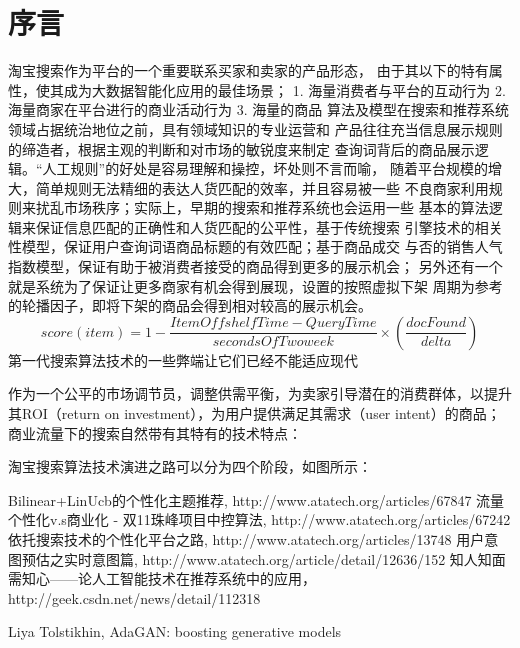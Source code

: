 
\chapter{序言}
\thispagestyle{empty}

\setlength{\fboxrule}{0pt}\setlength{\fboxsep}{0cm}
\noindent\shadowbox{
\begin{tcolorbox}[arc=0mm,colback=lightblue,colframe=darkblue,title=学习目标与要求]

\end{tcolorbox}}
\setlength{\fboxrule}{1pt}\setlength{\fboxsep}{4pt}

淘宝搜索作为平台的一个重要联系买家和卖家的产品形态， 
由于其以下的特有属性，使其成为大数据智能化应用的最佳场景；
1. 海量消费者与平台的互动行为
2. 海量商家在平台进行的商业活动行为
3. 海量的商品
算法及模型在搜索和推荐系统领域占据统治地位之前，具有领域知识的专业运营和
产品往往充当信息展示规则的缔造者，根据主观的判断和对市场的敏锐度来制定
查询词背后的商品展示逻辑。“人工规则”的好处是容易理解和操控，坏处则不言而喻，
随着平台规模的增大，简单规则无法精细的表达人货匹配的效率，并且容易被一些
不良商家利用规则来扰乱市场秩序；实际上，早期的搜索和推荐系统也会运用一些
基本的算法逻辑来保证信息匹配的正确性和人货匹配的公平性，基于传统搜索
引擎技术的相关性模型，保证用户查询词语商品标题的有效匹配；基于商品成交
与否的销售人气指数模型，保证有助于被消费者接受的商品得到更多的展示机会；
另外还有一个就是系统为了保证让更多商家有机会得到展现，设置的按照虚拟下架
周期为参考的轮播因子，即将下架的商品会得到相对较高的展示机会。
$$
	score(item)=1-\frac{ItemOffshelfTime-QueryTime}{secondsOfTwoweek}\times(\frac{docFound}{delta})
$$
第一代搜索算法技术的一些弊端让它们已经不能适应现代


作为一个公平的市场调节员，调整供需平衡，为卖家引导潜在的消费群体，以提升其ROI（return on investment），为用户提供满足其需求（user intent）的商品；商业流量下的搜索自然带有其特有的技术特点：

淘宝搜索算法技术演进之路可以分为四个阶段，如图所示： 


\begin{thebibliography}{99}
 Bilinear+LinUcb的个性化主题推荐, http://www.atatech.org/articles/67847
 流量个性化v.s商业化 - 双11珠峰项目中控算法, http://www.atatech.org/articles/67242
 依托搜索技术的个性化平台之路, http://www.atatech.org/articles/13748
 用户意图预估之实时意图篇, http://www.atatech.org/article/detail/12636/152
 知人知面需知心——论人工智能技术在推荐系统中的应用，http://geek.csdn.net/news/detail/112318


 Liya Tolstikhin,  AdaGAN: boosting generative models


\end{thebibliography}

 
